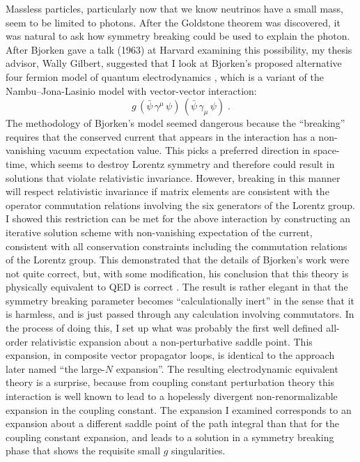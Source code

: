 \documentclass[12pt]{article}
\begin{document}
    Massless particles, particularly now that we know neutrinos have a
    small mass, seem to be limited to photons. After the
    Goldstone theorem was discovered, it was natural to ask how
    symmetry breaking could be used to explain the photon.  After
    Bjorken gave a talk (1963) at Harvard examining this possibility,
    my thesis advisor, Wally Gilbert, suggested that I look at
    Bjorken's proposed alternative four fermion model of quantum
    electrodynamics \cite{jb;1963}, which is a variant of the
    Nambu--Jona-Lasinio model with vector-vector interaction:
    \begin{equation*} g\, (\bar\psi\, \gamma^{\mu}\, \psi)\, (\bar\psi\,
      \gamma_{\mu}\, \psi) \; .  \end{equation*} The methodology of Bjorken's
    model seemed dangerous because the ``breaking'' requires that the
    conserved current that appears in the interaction has a non-vanishing
    vacuum expectation value. This picks a preferred direction in space-time,
    which seems to destroy Lorentz symmetry and therefore could result in
    solutions that violate relativistic invariance. However, breaking in this
    manner will respect relativistic invariance if matrix elements are
    consistent with the operator commutation relations involving the six
    generators of the Lorentz group. I showed this restriction can be met for
    the above interaction by constructing an iterative solution scheme with
    non-vanishing expectation of the current, consistent with all conservation
    constraints including the commutation relations of the Lorentz group. This
    demonstrated that the details of Bjorken's work were not quite correct,
    but, with some modification, his conclusion that this theory is physically
    equivalent to QED is correct \cite{ggff1;194,ggff2;1964}. The result is
    rather elegant in that the symmetry breaking parameter becomes
    ``calculationally inert'' in the sense that it is harmless, and is just
    passed through any calculation involving commutators. In the process of
    doing this, I set up what was probably the first well defined all-order
    relativistic expansion about a non-perturbative saddle point. This
    expansion, in composite vector propagator loops, is identical to the
    approach later named ``the large-$N$ expansion''.  The resulting
    electrodynamic equivalent theory is a surprise, because from coupling
    constant perturbation theory this interaction is well known to lead to a
    hopelessly divergent non-renormalizable expansion in the coupling
    constant.  The expansion I examined corresponds to an expansion about a
    different saddle point of the path integral than that for the coupling
    constant expansion, and leads to a solution in a symmetry breaking phase
    that shows the requisite small $g$ singularities.
\end{document}
